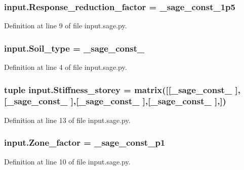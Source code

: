 \hypertarget{namespaceinput_aa6d0078a6d934c0d515d85059525e938}{}
\subsubsection[{Response\+\_\+reduction\+\_\+factor}]{\setlength{\rightskip}{0pt plus 5cm}input.\+Response\+\_\+reduction\+\_\+factor = \+\_\+sage\+\_\+const\+\_\+1p5}\label{namespaceinput_aa6d0078a6d934c0d515d85059525e938}


Definition at line 9 of file input.\+sage.\+py.

\hypertarget{namespaceinput_a6221ae01cf2fb9e8cd22204749785a0e}{}
\subsubsection[{Soil\+\_\+type}]{\setlength{\rightskip}{0pt plus 5cm}input.\+Soil\+\_\+type = {\bf \+\_\+sage\+\_\+const\+\_}}\label{namespaceinput_a6221ae01cf2fb9e8cd22204749785a0e}


Definition at line 4 of file input.\+sage.\+py.

\hypertarget{namespaceinput_a3853184afbe677b2a218690766c4f5e4}{}
\subsubsection[{Stiffness\+\_\+storey}]{\setlength{\rightskip}{0pt plus 5cm}tuple input.\+Stiffness\+\_\+storey = matrix(\mbox{[}\mbox{[}\+\_\+sage\+\_\+const\+\_ \mbox{]},\mbox{[}\+\_\+sage\+\_\+const\+\_ \mbox{]},\mbox{[}\+\_\+sage\+\_\+const\+\_ \mbox{]},\mbox{[}\+\_\+sage\+\_\+const\+\_ \mbox{]},\mbox{]})}\label{namespaceinput_a3853184afbe677b2a218690766c4f5e4}


Definition at line 13 of file input.\+sage.\+py.

\hypertarget{namespaceinput_aeea70e58ec9bb0d3d6c4363867eb0f82}{}
\subsubsection[{Zone\+\_\+factor}]{\setlength{\rightskip}{0pt plus 5cm}input.\+Zone\+\_\+factor = \+\_\+sage\+\_\+const\+\_\+p1}\label{namespaceinput_aeea70e58ec9bb0d3d6c4363867eb0f82}


Definition at line 10 of file input.\+sage.\+py.

